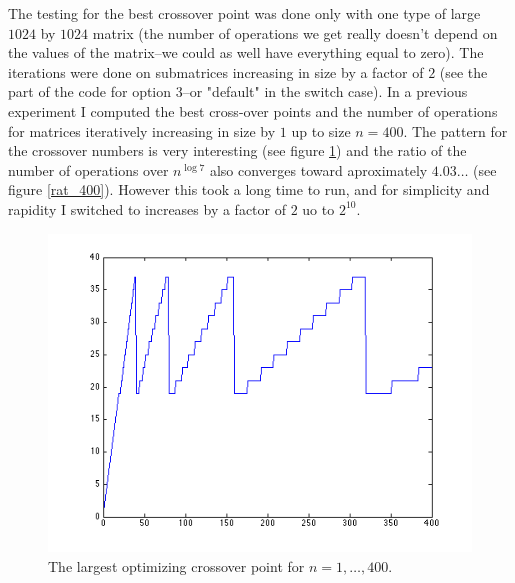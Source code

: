 \documentclass{article}
\begin{document}
The testing for the best crossover point was done only with one type of large $ 1024 $ by $ 1024 $ matrix (the number of operations we get really doesn't depend on the values of the matrix--we could as well have everything equal to zero).  
The iterations were done on submatrices increasing in size by a factor of $ 2 $ (see the part of the code for option 3--or "default" in the switch case).
In a previous experiment I computed the best cross-over points and the number of operations for matrices iteratively increasing in size by $ 1 $ up to size $ n = 400 $.  
The pattern for the crossover numbers is very interesting (see figure \ref{coef_400}) and the ratio of the number of operations over $ n^{\log 7} $ also converges toward aproximately $ 4.03\ldots $ (see figure \ref{rat_400}).
However this took a long time to run, and for simplicity and rapidity I switched to increases by a factor of $ 2 $ uo to $ 2^10 $.
\begin{figure}[h]
\vspace{.2in}
\centerline {
	\includegraphics[scale=.6]{coef_400.png}
}
\caption{The largest optimizing crossover point for $ n = 1, \ldots, 400 $. \label{coef_400}}
\end{figure}
\end{document}
